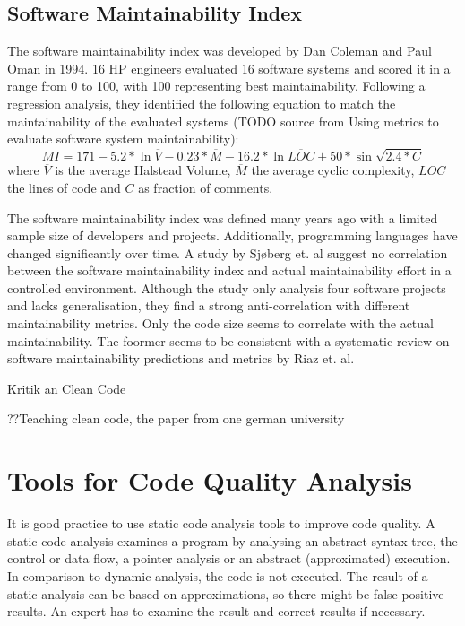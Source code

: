 \subsection{Software Maintainability Index}
The software maintainability index was developed by Dan Coleman and Paul Oman in 1994. 16 HP engineers evaluated 16 software systems and scored it in a range from 0 to 100, with 100 representing best maintainability. 
Following a regression analysis, they identified the following equation to match the maintainability of the evaluated systems (TODO source from Using metrics to evaluate software system maintainability):
\begin{displaymath}
MI = 171 - 5.2 *\ln{\overline{V}} - 0.23 * \overline{M} - 16.2 * \ln{\overline{LOC}} + 50 * \sin{\sqrt{2.4 * C}}
\end{displaymath}
where $\overline{V}$ is the average Halstead Volume, $\overline{M}$ the average cyclic complexity, $LOC$ the lines of code and $C$ as fraction of comments.

The software maintainability index was defined many years ago with a limited sample size of developers and projects. Additionally, programming languages have changed significantly over time. A study by Sjøberg et. al suggest no correlation between the software maintainability index and actual maintainability effort in a controlled environment\cite{sjoberg_questioning_nodate}. Although the study only analysis four software projects and lacks generalisation, they find a strong anti-correlation with different maintainability metrics. Only the code size seems to correlate with the actual maintainability. The foormer seems to be consistent with a systematic review on software maintainability predictions and metrics by Riaz et. al\cite{riaz_systematic_2009}.



Kritik an Clean Code

??Teaching clean code, the paper from one german university

\section{Tools for Code Quality Analysis}
It is good practice to use static code analysis tools to improve code quality. A static code analysis examines a program by analysing an abstract syntax tree, the control or data flow, a pointer analysis or an abstract (approximated) execution. In comparison to dynamic analysis, the code is not executed. The result of a static analysis can be based on approximations, so there might be false positive results. An expert has to examine the result and correct results if necessary\cite{prahofer_static_2017}.

